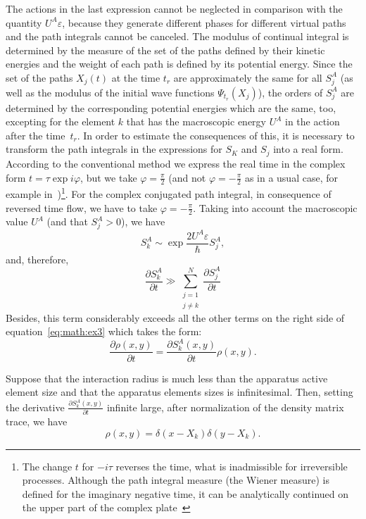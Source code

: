 The actions in the last expression cannot be neglected in comparison with the quantity $U^A\varepsilon$, because they generate different phases for different virtual paths and the path integrals cannot be canceled. The modulus of continual integral is determined by the measure of the set of the paths defined by their kinetic energies and the weight of each path is defined by its potential energy. Since the set of the paths $X_j(t)$ at the time $t_r$ are approximately the same for all $S^A_j$ (as well as the modulus of the initial wave functions $\Psi_{t_r}(X_j)$), the orders of $S^A_j$   are determined by the corresponding potential energies which are the same, too, excepting for the element $k$ that has the macroscopic energy $U^A$ in the action after the time~$t_r$. In order to estimate the consequences of this, it is necessary to transform the path integrals in the expressions for $S_K$ and $S_j$ into a real form. According to the conventional method we express the real time in the complex form $t=\tau\exp i\varphi$, but we take $\varphi=\frac{\pi}{2}$  (and not $\varphi=-\frac{\pi}{2}$ as in a usual case, for example in~\cite{bib:12})\footnote{The change $t$ for $-i\tau$ reverses the time, what is inadmissible for irreversible processes. Although the path integral measure (the Wiener measure) is defined for the imaginary negative time, it can be analytically continued on the upper part of the complex plate~\cite{bib:15}}\!\!. For the complex conjugated path integral, in consequence of reversed time flow, we have to take $\varphi=-\frac{\pi}{2}$. Taking into account the macroscopic value $U^A$  (and that $S^A_j>0$), we have 
\begin{equation*}
 S^A_k\sim\exp\frac{2U^A\varepsilon}{\hbar}S^A_j,
\end{equation*}
and, therefore,
\begin{equation*}
 \frac{\partial S^A_k}{\partial t} \gg \sum\limits_{\substack{j=1\\j\neq k}}^N\frac{\partial S^A_j}{\partial t}
\end{equation*}
Besides, this term considerably exceeds all the other terms on the right side of equation~\eqref{eq:math:ex3} which takes the form:
\begin{equation*}
 \frac{\partial\rho(x,y)}{\partial t}=\frac{\partial S^A_k(x,y)}{\partial t}\rho(x,y).
\end{equation*}

Suppose that the interaction radius is much less than the apparatus active element size and that the apparatus elements sizes is infinitesimal. Then, setting the derivative $\frac{\partial S^A_k(x,y)}{\partial t}$ infinite large, after normalization of the density matrix trace, we have
\begin{equation*}
\rho(x,y)=\delta(x-X_k)\delta(y-X_k).
\end{equation*}

